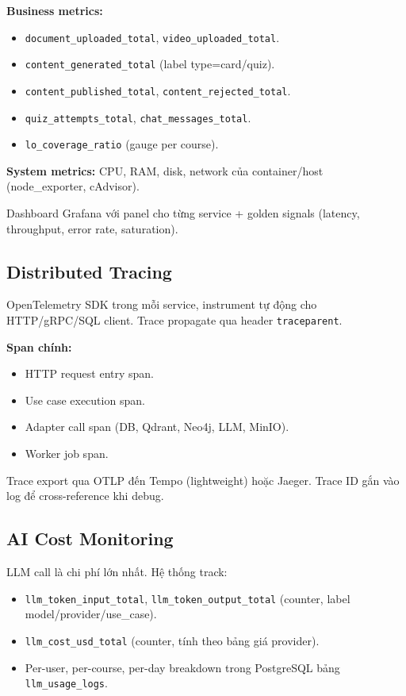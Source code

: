 \textbf{Business metrics:}
\begin{itemize}
    \item \texttt{document\_uploaded\_total}, \texttt{video\_uploaded\_total}.
    \item \texttt{content\_generated\_total} (label type=card/quiz).
    \item \texttt{content\_published\_total},
          \texttt{content\_rejected\_total}.
    \item \texttt{quiz\_attempts\_total}, \texttt{chat\_messages\_total}.
    \item \texttt{lo\_coverage\_ratio} (gauge per course).
\end{itemize}

\textbf{System metrics:} CPU, RAM, disk, network của container/host
(node\_exporter, cAdvisor).

Dashboard Grafana với panel cho từng service + golden signals (latency,
throughput, error rate, saturation).

\subsection{Distributed Tracing}

OpenTelemetry SDK trong mỗi service, instrument tự động cho HTTP/gRPC/SQL
client. Trace propagate qua header \texttt{traceparent}.

\textbf{Span chính:}
\begin{itemize}
    \item HTTP request entry span.
    \item Use case execution span.
    \item Adapter call span (DB, Qdrant, Neo4j, LLM, MinIO).
    \item Worker job span.
\end{itemize}

Trace export qua OTLP đến Tempo (lightweight) hoặc Jaeger. Trace ID gắn
vào log để cross-reference khi debug.

\subsection{AI Cost Monitoring}

LLM call là chi phí lớn nhất. Hệ thống track:

\begin{itemize}
    \item \texttt{llm\_token\_input\_total}, \texttt{llm\_token\_output\_total}
          (counter, label model/provider/use\_case).
    \item \texttt{llm\_cost\_usd\_total} (counter, tính theo bảng giá
          provider).
    \item Per-user, per-course, per-day breakdown trong PostgreSQL bảng
          \texttt{llm\_usage\_logs}.
\end{itemize}

